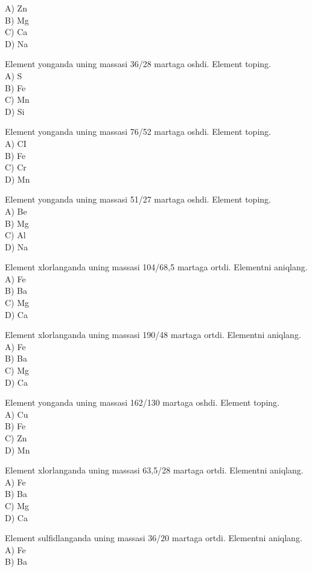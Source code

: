 A) Zn\\
B) Mg\\
C) Ca\\
D) Na
  \item Element yonganda uning massasi 36/28 martaga oshdi. Element toping.\\
A) S\\
B) Fe\\
C) Mn\\
D) Si\\
  \item Element yonganda uning massasi 76/52 martaga oshdi. Element toping.\\
A) CI\\
B) Fe\\
C) Cr\\
D) Mn
  \item Element yonganda uning massasi 51/27 martaga oshdi. Element toping.\\
A) Be\\
B) Mg\\
C) Al\\
D) Na
  \item Element xlorlanganda uning massasi 104/68,5 martaga ortdi. Elementni aniqlang.\\
A) Fe\\
B) Ba\\
C) Mg\\
D) Ca
  \item Element xlorlanganda uning massasi 190/48 martaga ortdi. Elementni aniqlang.\\
A) Fe\\
B) Ba\\
C) Mg\\
D) Ca
  \item Element yonganda uning massasi 162/130 martaga oshdi. Element toping.\\
A) Cu\\
B) Fe\\
C) Zn\\
D) Mn
  \item Element xlorlanganda uning massasi 63,5/28 martaga ortdi. Elementni aniqlang.\\
A) Fe\\
B) Ba\\
C) Mg\\
D) Ca
  \item Element sulfidlanganda uning massasi 36/20 martaga ortdi. Elementni aniqlang.\\
A) Fe\\
B) Ba\\
